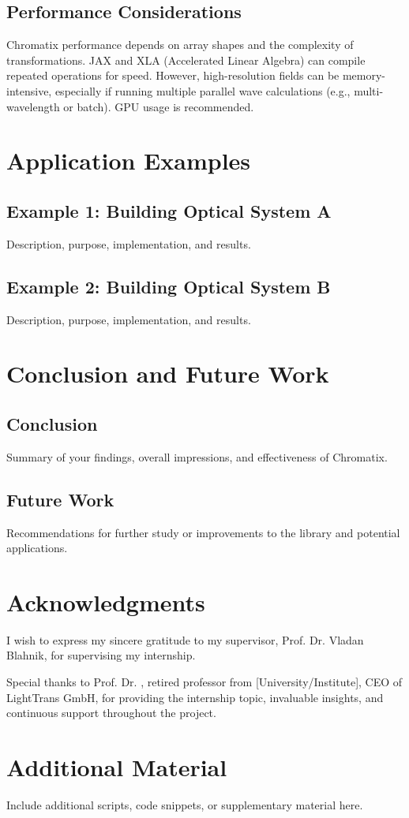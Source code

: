 \documentclass[a4paper,12pt]{report}
\begin{document}
\section{Performance Considerations}
Chromatix performance depends on array shapes and the complexity of transformations. JAX and XLA (Accelerated Linear Algebra) can compile repeated operations for speed. However, high-resolution fields can be memory-intensive, especially if running multiple parallel wave calculations (e.g., multi-wavelength or batch). GPU usage is recommended.

\chapter{Application Examples}
\section{Example 1: Building Optical System A}
Description, purpose, implementation, and results.

\section{Example 2: Building Optical System B}
Description, purpose, implementation, and results.

\chapter{Conclusion and Future Work}
\section{Conclusion}
Summary of your findings, overall impressions, and effectiveness of Chromatix.

\section{Future Work}
Recommendations for further study or improvements to the library and potential applications.

\chapter{Acknowledgments}
I wish to express my sincere gratitude to my supervisor, Prof. Dr. Vladan Blahnik, for supervising my internship. 

Special thanks to Prof. Dr. , retired professor from [University/Institute], CEO of LightTrans GmbH, for providing the internship topic, invaluable insights, and continuous support throughout the project. 






\appendix
\chapter{Additional Material}
Include additional scripts, code snippets, or supplementary material here.
\end{document}
